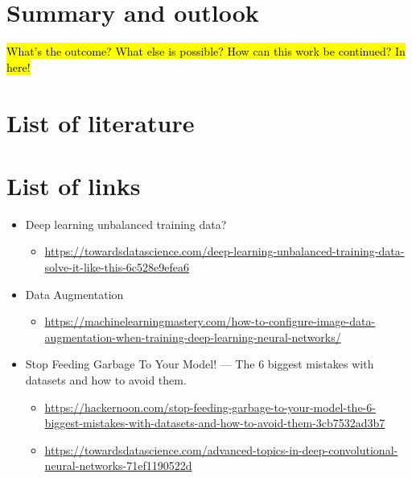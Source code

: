 \documentclass[10pt]{article}
\begin{document}
	\pagebreak
	\section{Summary and outlook}
		\hl{What's the outcome? What else is possible? How can this work be continued? In here!}


	\pagebreak
	\renewcommand{\listfigurename}{List of figures}
	\listoffigures
	\listoftables
	


	\pagebreak	
	\section*{List of literature}
		\printbibliography[heading=none]
	


	\pagebreak	
	\section*{List of links}
		\begin{itemize}
			\item Deep learning unbalanced training data?
			\begin{itemize}
				\item \url{https://towardsdatascience.com/deep-learning-unbalanced-training-data-solve-it-like-this-6c528e9efea6}
			\end{itemize}
			\item Data Augmentation
			\begin{itemize}
				\item \url{https://machinelearningmastery.com/how-to-configure-image-data-augmentation-when-training-deep-learning-neural-networks/}
			\end{itemize}
			\item Stop Feeding Garbage To Your Model! — The 6 biggest mistakes with datasets and how to avoid them.
			\begin{itemize}
				\item \url{https://hackernoon.com/stop-feeding-garbage-to-your-model-the-6-biggest-mistakes-with-datasets-and-how-to-avoid-them-3cb7532ad3b7}
			\end{itemize}
			\begin{itemize}
				\item \url{https://towardsdatascience.com/advanced-topics-in-deep-convolutional-neural-networks-71ef1190522d}
			\end{itemize}
		\end{itemize}
	
\end{document}
